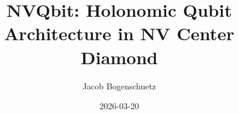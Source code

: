 \documentclass[11pt,letterpaper]{article}
\begin{document}
\title{NVQbit: Holonomic Qubit Architecture in NV Center Diamond}
\author{Jacob Bogenschuetz}
\date{2026-03-20}
\maketitle
\tableofcontents
\newpage































\end{document}
